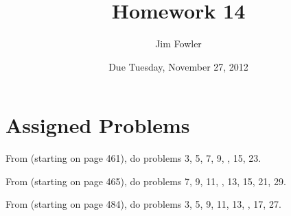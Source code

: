 \documentclass[12pt]{handout}
\title{Homework 14}
\date{Due Tuesday, November 27, 2012}
\author{Jim Fowler}
\begin{document}
\maketitle











\section*{Assigned Problems}

From  (starting on page 461),
do problems 3, 5, 7, 9, , 15, 23.
\vspace{1ex}

From  (starting on page 465),
do problems 7, 9, 11, , 13, 15, 21, 29.
\vspace{1ex}

From  (starting on page 484),
do problems 3, 5, 9, 11, 13, , 17, 27.
\vspace{1ex}
\end{document}
